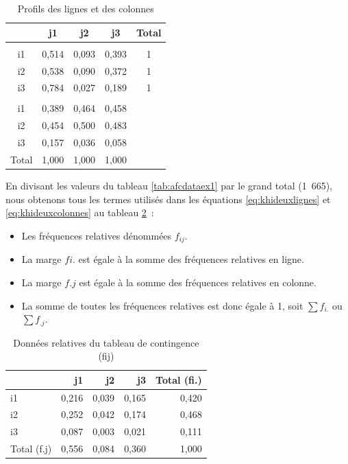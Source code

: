\documentclass[
  11pt,
  french,
]{book}
\providecommand{\tightlist}{%
  \setlength{\itemsep}{0pt}\setlength{\parskip}{0pt}}
\begin{document}
\begin{table}

\caption{\label{tab:afcProfilsLignesCols}Profils des lignes et des colonnes}
\centering
\fontsize{8}{10}\selectfont
\begin{tabular}[t]{ccccc}
\toprule
 & j1 & j2 & j3 & Total\\
\midrule
\addlinespace[0.3em]
\multicolumn{5}{l}{\textbf{Profil des lignes}}\\
\hspace{1em}i1 & 0,514 & 0,093 & 0,393 & 1\\
\hspace{1em}i2 & 0,538 & 0,090 & 0,372 & 1\\
\hspace{1em}i3 & 0,784 & 0,027 & 0,189 & 1\\
\addlinespace[0.3em]
\multicolumn{5}{l}{\textbf{Profils des colonnes}}\\
\hspace{1em}i1 & 0,389 & 0,464 & 0,458 & \\
\hspace{1em}i2 & 0,454 & 0,500 & 0,483 & \\
\hspace{1em}i3 & 0,157 & 0,036 & 0,058 & \\
\hspace{1em}Total & 1,000 & 1,000 & 1,000 & \\
\bottomrule
\end{tabular}
\end{table}

En divisant les valeurs du tableau \ref{tab:afcdataex1} par le grand total (1~665), nous obtenons tous les termes utilisés dans les équations \eqref{eq:khideuxlignes} et \eqref{eq:khideuxcolonnes} au tableau \ref{tab:afcdataex2}~:

\begin{itemize}
\tightlist
\item
  Les fréquences relatives dénommées \(f_{ij}\).
\item
  La marge \(fi.\) est égale à la somme des fréquences relatives en ligne.
\item
  La marge \(f.j\) est égale à la somme des fréquences relatives en colonne.
\item
  La somme de toutes les fréquences relatives est donc égale à 1, soit \(\sum{f_{i.}}\) ou \(\sum{f_{.j}}\).
\end{itemize}

\begin{table}

\caption{\label{tab:afcdataex2}Données relatives du tableau de contingence (fij)}
\centering
\fontsize{8}{10}\selectfont
\begin{tabular}[t]{lrrrr}
\toprule
  & j1 & j2 & j3 & Total (fi.)\\
\midrule
i1 & 0,216 & 0,039 & 0,165 & 0,420\\
i2 & 0,252 & 0,042 & 0,174 & 0,468\\
i3 & 0,087 & 0,003 & 0,021 & 0,111\\
Total (f.j) & 0,556 & 0,084 & 0,360 & 1,000\\
\bottomrule
\end{tabular}
\end{table}
\end{document}
